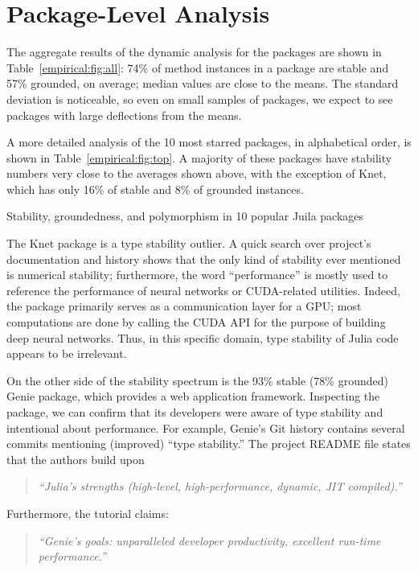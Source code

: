 \section{Package-Level Analysis}

The aggregate results of the dynamic analysis for the \goodpkgsnum packages are
shown in Table~\ref{empirical:fig:all}: 74\% of method instances in a package
are stable and 57\% grounded, on average; median values are close to the means.
The standard deviation is noticeable, so even on small samples of packages, we
expect to see packages with large deflections from the means.

A more detailed analysis of the 10 most starred packages, in alphabetical order,
is shown in Table~\ref{empirical:fig:top}. A majority of these packages have
stability numbers very close to the averages shown above, with the exception of
Knet, which has only 16\% of stable and 8\% of grounded instances.


\begin{table}[h]\small
\caption{Stability, groundedness, and polymorphism in 10 popular Juila packages}%
\label{empirical:fig:top}

\end{table}

The Knet package is a type stability outlier. A quick search over project's
documentation and history shows that the only kind of stability ever mentioned
is numerical stability; furthermore, the word ``performance'' is mostly used to
reference the performance of neural networks or CUDA-related utilities. Indeed,
the package primarily serves as a communication layer for a GPU; most
computations are done by calling the CUDA API for the purpose of building deep
neural networks. Thus, in this specific domain, type stability of Julia code
appears to be irrelevant.

On the other side of the stability spectrum is the 93\% stable (78\% grounded)
Genie package, which provides a web application framework. Inspecting the
package,
%
we can confirm that its developers were aware of type stability and
intentional about performance.
%
For example, Genie's Git history contains several commits mentioning (improved)
``type stability.''
The project README file states that the authors build upon
\begin{quote}
\itshape ``Julia's strengths (high-level, high-performance, dynamic, JIT compiled).''
\end{quote}
Furthermore, the tutorial claims:
\begin{quote}
\itshape ``Genie's goals: unparalleled developer productivity, excellent run-time
performance.''
\end{quote}

